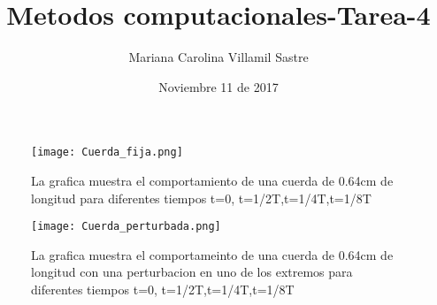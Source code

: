 \documentclass[]{article}
\title{Metodos computacionales-Tarea-4}
\author{Mariana Carolina Villamil Sastre}
\date{Noviembre 11 de 2017}
\begin{document}
\begin{figure}[!h]
{
	\texttt{[image: Cuerda\_fija.png]}
	\caption{La grafica muestra el comportamiento de una cuerda de 0.64cm de longitud para diferentes tiempos t=0, t=1/2T,t=1/4T,t=1/8T}
}
\end{figure}


\begin{figure}[!h]
{
	\texttt{[image: Cuerda\_perturbada.png]}
	\caption{La grafica muestra el comportameinto de una cuerda de 0.64cm de longitud con una perturbacion en uno de los extremos para diferentes tiempos t=0, t=1/2T,t=1/4T,t=1/8T}
}
\end{figure}
\end{document}
